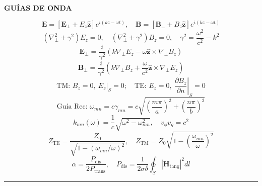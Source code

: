 \documentclass[twocolumn]{article}
\begin{document}
	\begin{center}\textbf{\footnotesize GUÍAS DE ONDA}\end{center}
	\vspace{-2mm}
	\begin{equation*}
		\mathbf{E} = \left[\mathbf{E}_\perp + E_z\hat{\mathbf{z}}\right]e^{i(kz-\omega t)}, \quad \mathbf{B} = \left[\mathbf{B}_\perp + B_z\hat{\mathbf{z}}\right]e^{i(kz-\omega t)}
	\end{equation*}
	\begin{equation*}
		(\nabla_\perp^2 + \gamma^2)E_z = 0, \quad (\nabla_\perp^2 + \gamma^2)B_z = 0, \quad \gamma^2 = \frac{\omega^2}{c^2} - k^2
	\end{equation*}
	\begin{equation*}
		\mathbf{E}_\perp = \frac{i}{\gamma^2}\left(k\nabla_\perp E_z - \omega\hat{\mathbf{z}}\times\nabla_\perp B_z\right)
	\end{equation*}
	\begin{equation*}
		\mathbf{B}_\perp = \frac{i}{\gamma^2}\left(k\nabla_\perp B_z + \frac{\omega}{c^2}\hat{\mathbf{z}}\times\nabla_\perp E_z\right)
	\end{equation*}
	\begin{equation*}
		\text{TM: } B_z=0, \ \left.E_z\right|_S = 0; \quad \text{TE: } E_z=0, \ \left.\frac{\partial B_z}{\partial n}\right|_S = 0
	\end{equation*}
	\begin{equation*}
		\text{Guía Rec: } \omega_{mn} = c\gamma_{mn} = c\sqrt{\left(\frac{m\pi}{a}\right)^2 + \left(\frac{n\pi}{b}\right)^2}
	\end{equation*}
	\begin{equation*}
		k_{mn}(\omega) = \frac{1}{c}\sqrt{\omega^2 - \omega_{mn}^2}, \quad v_\phi v_g = c^2
	\end{equation*}
	\begin{equation*}
		Z_{\text{TE}} = \frac{Z_0}{\sqrt{1 - (\omega_{mn}/\omega)^2}}, \quad Z_{\text{TM}} = Z_0\sqrt{1 - \left(\frac{\omega_{mn}}{\omega}\right)^2}
	\end{equation*}
	\begin{equation*}
		\alpha = \frac{P_{\text{dis}}}{2 P_{\text{trans}}}, \quad P_{\text{dis}} = \frac{1}{2\sigma\delta}\oint_{S} |\mathbf{H}_{\text{tang}}|^2 dl
	\end{equation*}
	
	\vspace{-2mm}\hrule\vspace{1mm}
	
\end{document}
